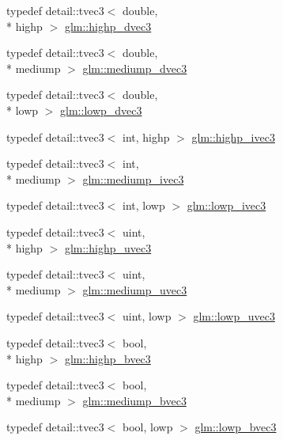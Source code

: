 \begin{DoxyCompactItemize}
\item 
typedef detail\-::tvec3$<$ double, \\*
highp $>$ \hyperlink{group__core__precision_ga4962711854156dae8ebb4eb39237c542}{glm\-::highp\-\_\-dvec3}
\item 
typedef detail\-::tvec3$<$ double, \\*
mediump $>$ \hyperlink{group__core__precision_gac051f0702cb0e717db5dd913f6261388}{glm\-::mediump\-\_\-dvec3}
\item 
typedef detail\-::tvec3$<$ double, \\*
lowp $>$ \hyperlink{group__core__precision_ga9bdb864f7242863e1227e3209f5b2dc4}{glm\-::lowp\-\_\-dvec3}
\item 
typedef detail\-::tvec3$<$ int, highp $>$ \hyperlink{group__core__precision_gae9f0a321de8ee92dce9d4400362d71e7}{glm\-::highp\-\_\-ivec3}
\item 
typedef detail\-::tvec3$<$ int, \\*
mediump $>$ \hyperlink{group__core__precision_ga520d24fa0ea887284b80a02c062ca7b8}{glm\-::mediump\-\_\-ivec3}
\item 
typedef detail\-::tvec3$<$ int, lowp $>$ \hyperlink{group__core__precision_gad133fec5c629e3f712c1270e15144e6c}{glm\-::lowp\-\_\-ivec3}
\item 
typedef detail\-::tvec3$<$ uint, \\*
highp $>$ \hyperlink{group__core__precision_ga66d0e4ae1742ede2eb32bf0bfedd7474}{glm\-::highp\-\_\-uvec3}
\item 
typedef detail\-::tvec3$<$ uint, \\*
mediump $>$ \hyperlink{group__core__precision_gaebdefe98b08421ef645f65c706af46b2}{glm\-::mediump\-\_\-uvec3}
\item 
typedef detail\-::tvec3$<$ uint, lowp $>$ \hyperlink{group__core__precision_ga26fd88e52fe7003d41b0c57c5edffd6e}{glm\-::lowp\-\_\-uvec3}
\item 
typedef detail\-::tvec3$<$ bool, \\*
highp $>$ \hyperlink{group__core__precision_ga1d77a773fdd024602413670788c10c62}{glm\-::highp\-\_\-bvec3}
\item 
typedef detail\-::tvec3$<$ bool, \\*
mediump $>$ \hyperlink{group__core__precision_gae7c8d0136e829d6fe3feb00856e35f11}{glm\-::mediump\-\_\-bvec3}
\item 
typedef detail\-::tvec3$<$ bool, lowp $>$ \hyperlink{group__core__precision_ga17ac2986f7b315a2ac4ee2662b5be9cb}{glm\-::lowp\-\_\-bvec3}
\item 

\end{DoxyCompactItemize}
